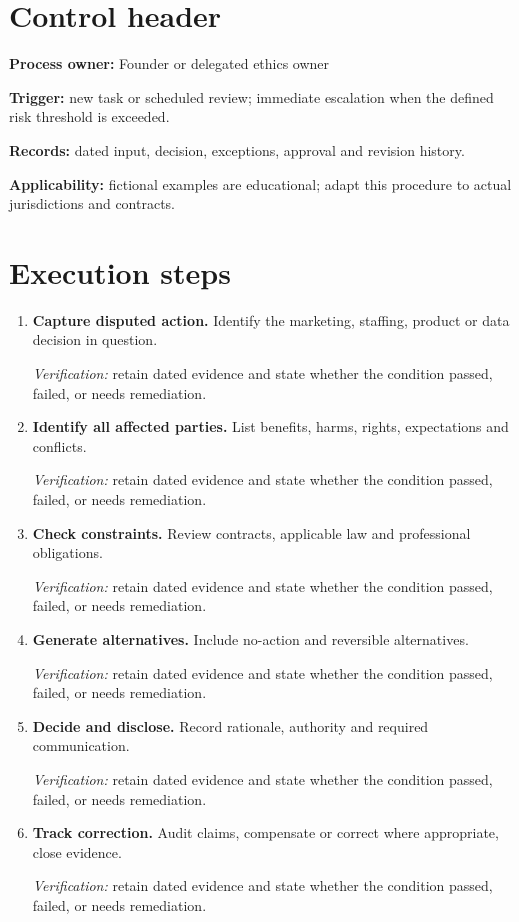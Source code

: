 \documentclass[11pt]{article}
\begin{document}
\SuiteOpen
\section{Control header}
\textbf{Process owner:} Founder or delegated ethics owner\par\textbf{Trigger:} new task or scheduled review; immediate escalation when the defined risk threshold is exceeded.\par\textbf{Records:} dated input, decision, exceptions, approval and revision history.\par\textbf{Applicability:} fictional examples are educational; adapt this procedure to actual jurisdictions and contracts.
\section{Execution steps}
\begin{enumerate}[leftmargin=*,itemsep=8pt]
\item \textbf{Capture disputed action.} Identify the marketing, staffing, product or data decision in question.\par\textit{Verification:} retain dated evidence and state whether the condition passed, failed, or needs remediation.
\item \textbf{Identify all affected parties.} List benefits, harms, rights, expectations and conflicts.\par\textit{Verification:} retain dated evidence and state whether the condition passed, failed, or needs remediation.
\item \textbf{Check constraints.} Review contracts, applicable law and professional obligations.\par\textit{Verification:} retain dated evidence and state whether the condition passed, failed, or needs remediation.
\item \textbf{Generate alternatives.} Include no-action and reversible alternatives.\par\textit{Verification:} retain dated evidence and state whether the condition passed, failed, or needs remediation.
\item \textbf{Decide and disclose.} Record rationale, authority and required communication.\par\textit{Verification:} retain dated evidence and state whether the condition passed, failed, or needs remediation.
\item \textbf{Track correction.} Audit claims, compensate or correct where appropriate, close evidence.\par\textit{Verification:} retain dated evidence and state whether the condition passed, failed, or needs remediation.
\end{enumerate}
\end{document}
